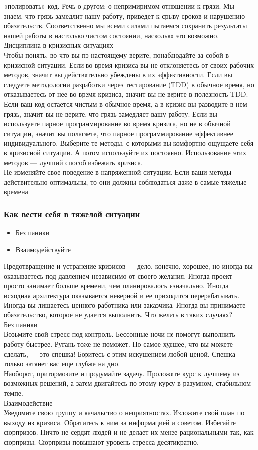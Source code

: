 \documentclass{../industrial-development}
\begin{document}
«полировать» код. Речь о другом: о непримиримом отношении к грязи. Мы знаем, что грязь замедлит нашу работу, приведет к срыву сроков
и нарушению обязательств. Соответственно мы всеми силами пытаемся сохранить результаты нашей работы в настолько чистом состоянии, насколько это возможно.\\
Дисциплина в кризисных ситуациях\\
Чтобы понять, во что вы по-настоящему верите, понаблюдайте за собой в кризисной ситуации. Если во время кризиса вы не отклоняетесь от своих рабочих методов, значит вы действительно убеждены в их эффективности. Если вы следуете методологии разработки через тестирование (TDD) в обычное время, но отказываетесь от нее во время кризиса, значит вы не верите в полезность TDD. Если ваш код остается чистым в обычное время, а в кризис вы разводите в нем грязь, значит вы не верите, что грязь замедляет вашу работу. Если вы используете парное программирование во время кризиса, но не в обычной ситуации, значит вы полагаете, что парное программирование эффективнее индивидуального. Выберите те методы, с которыми вы комфортно ощущаете себя в кризисной ситуации. А потом используйте их постоянно. Использование этих методов — лучший способ избежать кризиса.\\
Не изменяйте свое поведение в напряженной ситуации. Если ваши методы действительно оптимальны, то они должны соблюдаться даже в самые тяжелые времена

\begin{frame} \frametitle{Как вести себя в тяжелой ситуации}
\begin{itemize}
  \item Без паники
  \item Взаимодействуйте
\end{itemize}
\end{frame}
\lecturenotes
Предотвращение и устранение кризисов — дело, конечно, хорошее, но иногда вы оказываетесь под давлением независимо от своего желания. Иногда проект просто занимает больше времени, чем планировалось изначально. Иногда исходная архитектура оказывается неверной и ее приходится перерабатывать. Иногда вы лишаетесь ценного работника или заказчика. Иногда вы принимаете обязательство, которое не удается выполнить. Что желать в таких случаях?\\
Без паники\\
Возьмите свой стресс под контроль. Бессонные ночи не помогут выполнить работу быстрее. Ругань тоже не поможет. Но самое худшее, что вы можете сделать, — это спешка! Боритесь с этим искушением любой ценой. Спешка только затянет вас еще глубже на дно.\\
Наоборот, притормозите и продумайте задачу. Проложите курс к лучшему из возможных решений, а затем двигайтесь по этому курсу в разумном, стабильном темпе.\\
Взаимодействие\\
Уведомите свою группу и начальство о неприятностях. Изложите свой план по выходу из кризиса. Обратитесь к ним за информацией и советом. Избегайте сюрпризов. Ничто не сердит людей и не делает их менее рациональными так, как сюрпризы. Сюрпризы повышают уровень стресса десятикратно.
\end{document}
